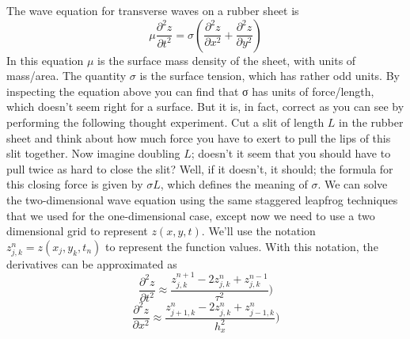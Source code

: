\documentclass{book}
\theoremstyle{plain}
\theoremstyle{definition}
\numberwithin{exm}{chapter}
\theoremstyle{remark}
\theoremstyle{summary}
\theoremstyle{overview}
\begin{document}
The wave equation for transverse waves on a rubber sheet is
\begin{equation}\label{eq:62}
\mu \frac{\partial^2 z}{\partial t^2} = \sigma (\frac{\partial^2 z}{\partial x^2} + \frac{\partial^2 z}{\partial y^2} )
\end{equation}
In this equation $\mu$ is the surface mass density of the sheet, with units of mass/area.
The quantity $\sigma$ is the surface tension, which has rather odd units. By inspecting
the equation above you can find that σ has units of force/length, which doesn\rq t
seem right for a surface. But it is, in fact, correct as you can see by performing the
following thought experiment. Cut a slit of length $L$ in the rubber sheet and think
about how much force you have to exert to pull the lips of this slit together. Now
imagine doubling $L$; doesn\rq t it seem that you should have to pull twice as hard to close the slit? Well, if it doesn\rq t, it should; the formula for this closing force is
given by $\sigma L$, which defines the meaning of $\sigma$.
We can solve the two-dimensional wave equation using the same staggered
leapfrog techniques that we used for the one-dimensional case, except now we
need to use a two dimensional grid to represent $z(x, y,t)$. We\rq ll use the notation $ z^n_{j,k} = z(x_j,y_k,t_n) $ to represent the function values. With this notation, the
derivatives can be approximated as
\begin{equation}\label{eq:63}
\frac{\partial^2 z}{\partial t^2} \approx \frac{z^{n+1}_{j,k}-2z^n_{j,k}+z^{n-1}_{j,k}}{\tau^2} )
\end{equation}
\begin{equation}\label{eq:64}
\frac{\partial^2 z}{\partial x^2} \approx \frac{z^{n}_{j+1,k}-2z^n_{j,k}+z^{n}_{j-1,k}}{h^2_x} )
\end{equation}\\
\end{document}
